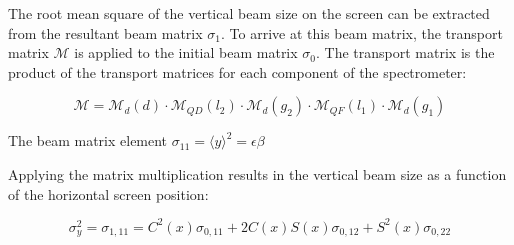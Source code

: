 The root mean square of the vertical beam size on the screen can be extracted
from the resultant beam matrix \(\sigma_1\).  To arrive at this beam matrix, the
transport matrix \(\mathcal{M}\) is applied to the initial beam matrix
\(\sigma_0\). The transport matrix is the product of the transport matrices for
each component of the spectrometer:

\begin{equation}
	\mathcal{M} = \mathcal{M}_d(d) \cdot \mathcal{M}_{QD}(l_2) \cdot \mathcal{M}_d(g_2)
				  \cdot \mathcal{M}_{QF}(l_1) \cdot \mathcal{M}_d(g_1)
\end{equation}


The beam matrix element \(\sigma_{11} = \langle y \rangle^2 = \epsilon\beta\)

Applying the matrix multiplication results in the vertical beam size as a
function of the horizontal screen position:

\begin{equation}
	\sigma_y^2 = \sigma_{1,11} = C^2(x)\sigma_{0,11} + 2C(x)S(x)\sigma_{0,12}
								+ S^2(x)\sigma_{0,22}
\end{equation}



